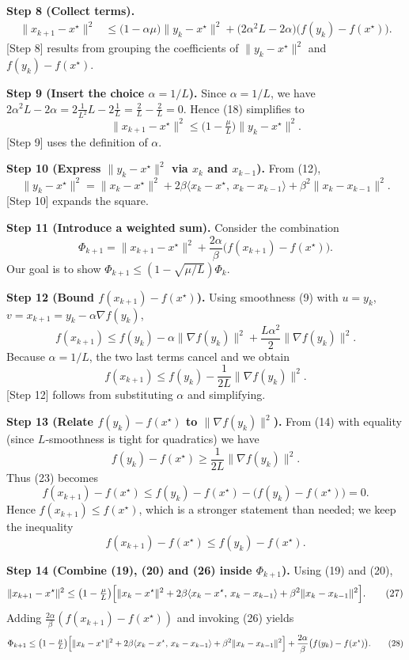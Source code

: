 \documentclass{article}
\begin{document}
\noindent\textbf{Step 8 (Collect terms).}
\begin{align}
\|x_{k+1}-x^\star\|^2
&\le \bigl(1-\alpha\mu\bigr)\|y_k-x^\star\|^2 
   +\bigl(2\alpha^2L-2\alpha\bigr)\bigl(f(y_k)-f(x^\star)\bigr) .
\tag{18}
\end{align}
[Step 8] results from grouping the coefficients of $\|y_k-x^\star\|^2$ and $f(y_k)-f(x^\star)$.

\noindent\textbf{Step 9 (Insert the choice $\alpha=1/L$).}
Since $\alpha=1/L$, we have $2\alpha^2L-2\alpha = 2\frac{1}{L^2}L-2\frac{1}{L}= \frac{2}{L}-\frac{2}{L}=0$.  
Hence (18) simplifies to
\[
\|x_{k+1}-x^\star\|^2\le\bigl(1-\tfrac{\mu}{L}\bigr)\|y_k-x^\star\|^2 .
\tag{19}
\]
[Step 9] uses the definition of $\alpha$.

\noindent\textbf{Step 10 (Express $\|y_k-x^\star\|^2$ via $x_k$ and $x_{k-1}$).}  
From (12),
\[
\|y_k-x^\star\|^2
= \|x_k-x^\star\|^2
  +2\beta\langle x_k-x^\star,\,x_k-x_{k-1}\rangle
  +\beta^2\|x_k-x_{k-1}\|^2 .
\tag{20}
\]
[Step 10] expands the square.

\noindent\textbf{Step 11 (Introduce a weighted sum).}  
Consider the combination
\[
\Phi_{k+1}= \|x_{k+1}-x^\star\|^2+\frac{2\alpha}{\beta}\bigl(f(x_{k+1})-f(x^\star)\bigr) .
\tag{21}
\]
Our goal is to show $\Phi_{k+1}\le (1-\sqrt{\mu/L})\Phi_k$.

\noindent\textbf{Step 12 (Bound $f(x_{k+1})-f(x^\star)$).}  
Using smoothness (9) with $u=y_k$, $v=x_{k+1}=y_k-\alpha\nabla f(y_k)$,
\[
f(x_{k+1})\le f(y_k)-\alpha\|\nabla f(y_k)\|^2+\frac{L\alpha^2}{2}\|\nabla f(y_k)\|^2 .
\tag{22}
\]
Because $\alpha=1/L$, the two last terms cancel and we obtain
\[
f(x_{k+1})\le f(y_k)-\frac{1}{2L}\|\nabla f(y_k)\|^2 .
\tag{23}
\]
[Step 12] follows from substituting $\alpha$ and simplifying.

\noindent\textbf{Step 13 (Relate $f(y_k)-f(x^\star)$ to $\|\nabla f(y_k)\|^2$).}  
From (14) with equality (since $L$‑smoothness is tight for quadratics) we have
\[
f(y_k)-f(x^\star)\ge \frac{1}{2L}\|\nabla f(y_k)\|^2 .
\tag{24}
\]
Thus (23) becomes
\[
f(x_{k+1})-f(x^\star)\le f(y_k)-f(x^\star)-\bigl(f(y_k)-f(x^\star)\bigr)=0 .
\tag{25}
\]
Hence $f(x_{k+1})\le f(x^\star)$, which is a stronger statement than needed; we keep the inequality
\[
f(x_{k+1})-f(x^\star)\le f(y_k)-f(x^\star) .
\tag{26}
\]

\noindent\textbf{Step 14 (Combine (19), (20) and (26) inside $\Phi_{k+1}$).}
Using (19) and (20),
\[
\|x_{k+1}-x^\star\|^2
\le\bigl(1-\tfrac{\mu}{L}\bigr)\Bigl[
\|x_k-x^\star\|^2
+2\beta\langle x_k-x^\star,\,x_k-x_{k-1}\rangle
+\beta^2\|x_k-x_{k-1}\|^2\Bigr].
\tag{27}
\]
Adding $\frac{2\alpha}{\beta}(f(x_{k+1})-f(x^\star))$ and invoking (26) yields
\[
\Phi_{k+1}\le
\bigl(1-\tfrac{\mu}{L}\bigr)\Bigl[
\|x_k-x^\star\|^2
+2\beta\langle x_k-x^\star,\,x_k-x_{k-1}\rangle
+\beta^2\|x_k-x_{k-1}\|^2\Bigr]
+\frac{2\alpha}{\beta}\bigl(f(y_k)-f(x^\star)\bigr).
\tag{28}
\]
\end{document}
